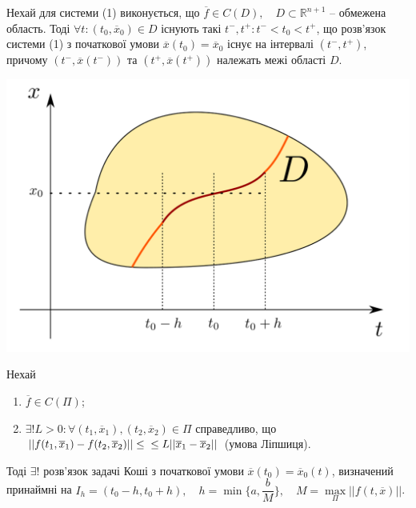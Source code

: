 \documentclass[14pt,a4paper]{scrartcl}
\theoremstyle{definition}
\theoremstyle{definition}
\theoremstyle{definition}
\begin{document}
\begin{boxteo}
Нехай для системи (1) виконується, що $\overline{f} \in C(D), \quad D \subset \mathbb{R}^{n + 1}$ -- обмежена область. Тоді $\forall t : (t_0, \overline{x}_0) \in D$ існують такі $t^{-}, t^{+} : t^{-} < t_0 < t^{+}$, що розв'язок системи (1) з початкової умови $\overline{x}(t_0) = \overline{x}_0$ існує на інтервалі $(t^{-}, t^{+})$, причому $(t^{-}, \overline{x}(t^{-})) \text{ та } (t^{+}, \overline{x}(t^{+}))$ належать межі області $D$.
    \begin{center} \includegraphics[scale=0.35]{assets/lect0.png} \end{center}
\end{boxteo}

\begin{boxteo}
  Нехай
  \begin{spacing}{1}
  \begin{enumerate}
    \item $\overline{f} \in C(\Pi)$;
    \item $\exists! L > 0 : \forall (t_1, \overline{x}_1), (t_2, \overline{x}_2) \in \Pi$ справедливо, що $|| f(t_1, \overline{x}_1) - f(t_2, \overline{x}_2)|| \leq \\ \leq L||\overline{x}_1 - \overline{x}_2||$ (умова Ліпшиця).
  \end{enumerate}
  \end{spacing}


  Тоді $\exists!$ розв'язок задачі Коші з початкової умови $\overline{x}(t_0) = \overline{x}_0(t)$, визначений принаймні на $I_h = (t_0 - h, t_0 + h), \quad h = \min\{{a, \dfrac{b}{M}}\}, \quad M = \max\limits_{\Pi}||f(t, \overline{x})||$.
\end{boxteo}
\end{document}
